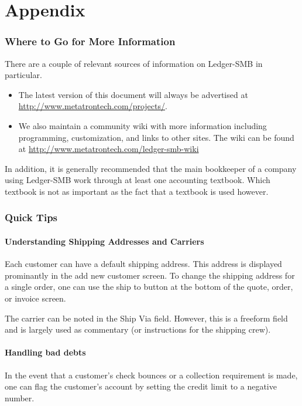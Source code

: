 \documentclass{article}
\begin{document}
\clearpage
\part{Appendix}
\appendix
\section{Where to Go for More Information}

There are a couple of relevant sources of information on Ledger-SMB in
particular.

\begin{itemize}
\item The latest version of this document will always be advertised at
\url{http://www.metatrontech.com/projects/}.
\item We also maintain a community wiki with more information including 
programming, customization, and links to other sites.  The wiki can be found at
\url{http://www.metatrontech.com/ledger-smb-wiki}
\end{itemize}

In addition, it is generally recommended that the main bookkeeper of a company
using Ledger-SMB work through at least one accounting textbook.  Which textbook
is not as important as the fact that a textbook is used however.

\section{Quick Tips}
\subsection{Understanding Shipping Addresses and Carriers}

Each customer can have a default shipping address.  This address is displayed
prominantly in the add new customer screen.  To change the shipping address for
a single order, one can use the ship to button at the bottom of the quote,
order, or invoice screen.  

The carrier can be noted in the Ship Via field.  However, this is a freeform
field and is largely used as commentary (or instructions for the shipping crew).

\subsection{Handling bad debts}
In the event that a customer's check bounces or a collection requirement is
made, one can flag the customer's account by setting the credit limit to a
negative number.
\end{document}
